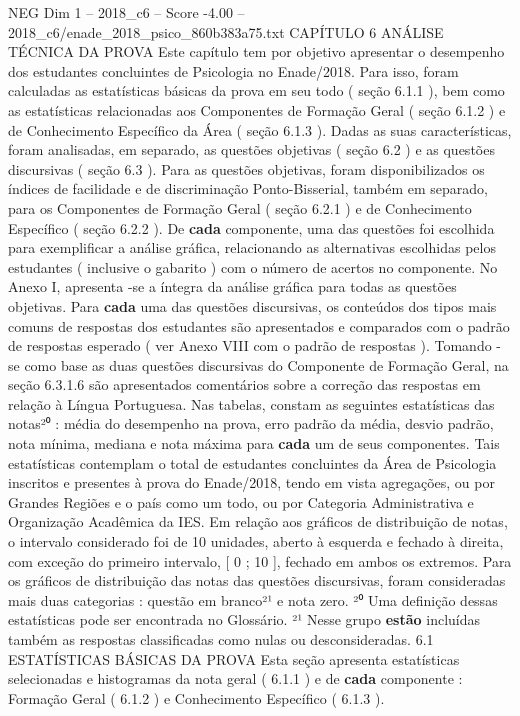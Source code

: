 \begin{textsample}{NEG Dim 1 – 2018\_c6 – Score -4.00 – 2018\_c6/enade\_2018\_psico\_860b383a75.txt}  \label{ex:f1_neg_192}
CAPÍTULO 6 ANÁLISE TÉCNICA DA PROVA Este capítulo tem por objetivo apresentar o desempenho dos estudantes concluintes de Psicologia no Enade/2018.
Para isso, foram calculadas as estatísticas básicas da prova em seu todo ( seção 6.1.1 ), bem como as estatísticas relacionadas aos Componentes de Formação Geral ( seção 6.1.2 ) e de Conhecimento Específico da Área ( seção 6.1.3 ).
Dadas as suas características, foram analisadas, em separado, as questões objetivas ( seção 6.2 ) e as questões discursivas ( seção 6.3 ).
Para as questões objetivas, foram disponibilizados os índices de facilidade e de discriminação Ponto-Bisserial, também em separado, para os Componentes de Formação Geral ( seção 6.2.1 ) e de Conhecimento Específico ( seção 6.2.2 ).
De \textbf{cada} componente, uma das questões foi escolhida para exemplificar a análise gráfica, relacionando as alternativas escolhidas pelos estudantes ( inclusive o gabarito ) com o número de acertos no componente.
No Anexo I, apresenta -se a íntegra da análise gráfica para todas as questões objetivas.
Para \textbf{cada} uma das questões discursivas, os conteúdos dos tipos mais comuns de respostas dos estudantes são apresentados e comparados com o padrão de respostas esperado ( ver Anexo VIII com o padrão de respostas ).
Tomando -se como base as duas questões discursivas do Componente de Formação Geral, na seção 6.3.1.6 são apresentados comentários sobre a correção das respostas em relação à Língua Portuguesa.
Nas tabelas, constam as seguintes estatísticas das notas²⁰ : média do desempenho na prova, erro padrão da média, desvio padrão, nota mínima, mediana e nota máxima para \textbf{cada} um de seus componentes.
Tais estatísticas contemplam o total de estudantes concluintes da Área de Psicologia inscritos e presentes à prova do Enade/2018, tendo em vista agregações, ou por Grandes Regiões e o país como um todo, ou por Categoria Administrativa e Organização Acadêmica da IES.
Em relação aos gráficos de distribuição de notas, o intervalo considerado foi de 10 unidades, aberto à esquerda e fechado à direita, com exceção do primeiro intervalo, [ 0 ; 10 ], fechado em ambos os extremos.
Para os gráficos de distribuição das notas das questões discursivas, foram consideradas mais duas categorias : questão em branco²¹ e nota zero. ²⁰ Uma definição dessas estatísticas pode ser encontrada no Glossário. ²¹ Nesse grupo \textbf{estão} incluídas também as respostas classificadas como nulas ou desconsideradas. 6.1 ESTATÍSTICAS BÁSICAS DA PROVA Esta seção apresenta estatísticas selecionadas e histogramas da nota geral ( 6.1.1 ) e de \textbf{cada} componente : Formação Geral ( 6.1.2 ) e Conhecimento Específico ( 6.1.3 ).

\end{textsample}
